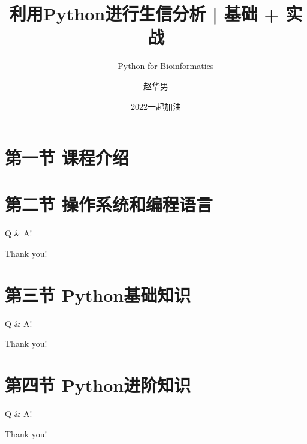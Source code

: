 \documentclass{beamer}
\title{利用Python进行生信分析 | 基础 + 实战}
\subtitle{—— Python for Bioinformatics}
\date{2022一起加油}
\author{赵华男}
\begin{document}
\maketitle

\section{第一节 \space 课程介绍}

\section{第二节 \space 操作系统和编程语言} %
\begin{frame}[standout] Q \& A! \end{frame}
\begin{frame}[standout] Thank you! \end{frame}

\section{第三节 \space Python基础知识} %






\begin{frame}[standout] Q \& A! \end{frame}
\begin{frame}[standout] Thank you! \end{frame}

\section{第四节 \space Python进阶知识}







\begin{frame}[standout] Q \& A! \end{frame}
\begin{frame}[standout] Thank you! \end{frame}
\end{document}
